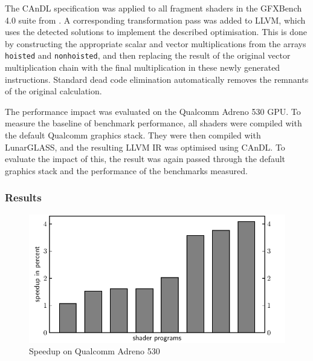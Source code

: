     The CAnDL specification was applied to all fragment shaders in the
    GFXBench 4.0 suite from \citet{gfxbench}.
    A corresponding transformation pass was added to LLVM, which uses the
    detected solutions to implement the described optimisation.
    This is done by constructing the appropriate scalar and vector
    multiplications from the arrays {\tt hoisted} and {\tt nonhoisted}, and then
    replacing the result of the original vector multiplication chain with the
    final multiplication in these newly generated instructions.
    Standard dead code elimination automatically removes the remnants of the
    original calculation.

    The performance impact was evaluated on the Qualcomm Adreno 530 GPU.
    To measure the baseline of benchmark performance, all shaders were
    compiled with the default Qualcomm graphics stack.
    They were then compiled with LunarGLASS, and the resulting LLVM IR was
    optimised using CAnDL.
    To evaluate the impact of this, the result was again passed through the
    default graphics stack and the performance of the benchmarks measured.

\subsubsection{Results}

\begin{figure}[t]
\centering
\includegraphics[width=0.66\linewidth]{figures/qualcomm_plot.pdf}
\caption{Speedup on Qualcomm Adreno 530}
\label{fig:qualcommspeedup}
\end{figure}


